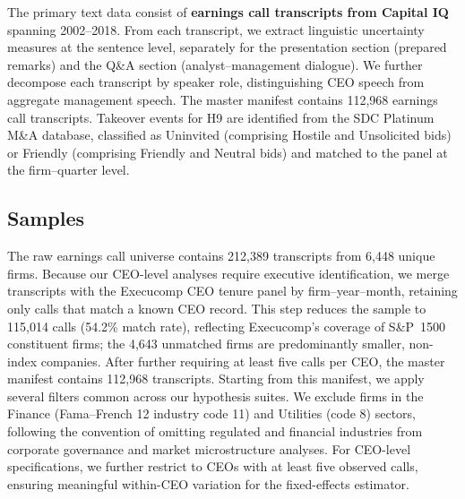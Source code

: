 \documentclass[12pt,a4paper]{article}
\begin{document}
The primary text data consist of \textbf{earnings call transcripts from Capital IQ} spanning 2002--2018. From each transcript, we extract linguistic uncertainty measures at the sentence level, separately for the presentation section (prepared remarks) and the Q\&A section (analyst--management dialogue). We further decompose each transcript by speaker role, distinguishing CEO speech from aggregate management speech. The master manifest contains 112,968 earnings call transcripts. Takeover events for H9 are identified from the SDC Platinum M\&A database, classified as Uninvited (comprising Hostile and Unsolicited bids) or Friendly (comprising Friendly and Neutral bids) and matched to the panel at the firm--quarter level.

\subsection{Samples}
\label{sec:samples}

The raw earnings call universe contains 212,389 transcripts from 6,448 unique firms. Because our CEO-level analyses require executive identification, we merge transcripts with the Execucomp CEO tenure panel by firm--year--month, retaining only calls that match a known CEO record. This step reduces the sample to 115,014 calls (54.2\% match rate), reflecting Execucomp's coverage of S\&P~1500 constituent firms; the 4,643 unmatched firms are predominantly smaller, non-index companies. After further requiring at least five calls per CEO, the master manifest contains 112,968 transcripts. Starting from this manifest, we apply several filters common across our hypothesis suites. We exclude firms in the Finance (Fama--French 12 industry code 11) and Utilities (code 8) sectors, following the convention of omitting regulated and financial industries from corporate governance and market microstructure analyses. For CEO-level specifications, we further restrict to CEOs with at least five observed calls, ensuring meaningful within-CEO variation for the fixed-effects estimator.
\end{document}
